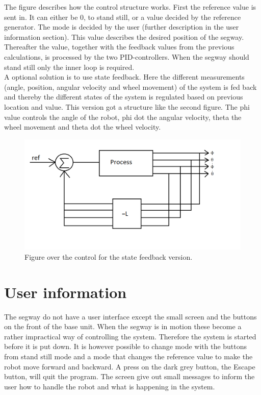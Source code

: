 \documentclass[a4paper]{article}
\begin{document}
The figure describes how the control structure works. First the reference value is sent in. It can either be 0, to stand still, or a value decided by the reference generator. The mode is decided by the user (further description in the user information section). This value describes the desired position of the segway. Thereafter the value, together with the feedback values from the previous calculations, is processed by the two PID-controllers. When the segway should stand still only the inner loop is required. \\

A optional solution is to use state feedback. Here the different measurements (angle, position, angular velocity and wheel movement) of the system is fed back and thereby the different states of the system is regulated based on previous location and value. This version got a structure like the second figure. The phi value controls the angle of the robot, phi dot the angular velocity, theta the wheel movement and theta dot the wheel velocity. \\

\begin{figure}[H]
 \centering
\includegraphics[scale=0.5]{pic/Statefeedback.png}
\caption{Figure over the control for the state feedback version.}
\end{figure}

\section{User information}

The segway do not have a user interface except the small screen and the buttons on the front of the base unit. When the segway is in motion these become a rather impractical way of controlling the system. Therefore the system is started before it is put down. It is however possible to change mode with the buttons from stand still mode and a mode that changes the reference value to make the robot move forward and backward. A press on the dark grey button, the Escape button, will quit the program. The screen give out small messages to inform the user how to handle the robot and what is happening in the system.\\
\end{document}
